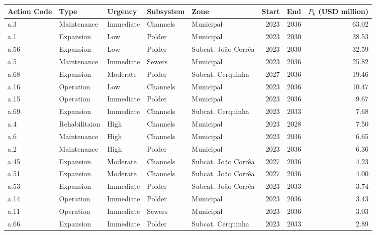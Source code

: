 \documentclass[11pt]{article}
\begin{document}
\begin{table}[t]
    \centering
    \tiny
\begin{tabular}{lllllrrr}
\toprule
\textbf{Action Code} &          \textbf{Type}&   \textbf{Urgency} &   \textbf{Subsystem} &                \textbf{Zone} &  \textbf{Start} &  \textbf{End} &    \textbf{$P_k$ (USD million)} \\
\midrule
 a.3 &   Maintenance & Immediate & Channels &           Municipal &   2023 & 2036 & 63.02 \\
 a.1 &     Expansion &       Low &   Polder &           Municipal &   2023 & 2030 & 38.53 \\
a.56 &     Expansion &       Low &   Polder & Subcat. João Corrêa &   2023 & 2030 & 32.59 \\
 a.5 &   Maintenance & Immediate &   Sewers &           Municipal &   2023 & 2036 & 25.82 \\
a.68 &     Expansion &  Moderate &   Polder &   Subcat. Cerquinha &   2027 & 2036 & 19.46 \\
a.16 &     Operation &       Low & Channels &           Municipal &   2023 & 2036 & 10.47 \\
a.15 &     Operation & Immediate &   Polder &           Municipal &   2023 & 2036 &  9.67 \\
a.69 &     Expansion & Immediate & Channels &   Subcat. Cerquinha &   2023 & 2033 &  7.68 \\
 a.4 & Rehabilitaion &      High & Channels &           Municipal &   2023 & 2028 &  7.50 \\
 a.6 &   Maintenance &      High & Channels &           Municipal &   2023 & 2036 &  6.65 \\
 a.2 &   Maintenance &      High &   Polder &           Municipal &   2023 & 2036 &  6.36 \\
a.45 &     Expansion &  Moderate & Channels & Subcat. João Corrêa &   2027 & 2036 &  4.23 \\
a.51 &     Expansion &  Moderate & Channels & Subcat. João Corrêa &   2027 & 2036 &  4.00 \\
a.53 &     Expansion & Immediate &   Polder & Subcat. João Corrêa &   2023 & 2033 &  3.74 \\
a.14 &     Operation & Immediate &   Polder &           Municipal &   2023 & 2036 &  3.43 \\
a.11 &     Operation & Immediate &   Sewers &           Municipal &   2023 & 2036 &  3.03 \\
a.66 &     Expansion & Immediate &   Polder &   Subcat. Cerquinha &   2023 & 2033 &  2.89 \\

\end{tabular}
\end{table}
\end{document}
